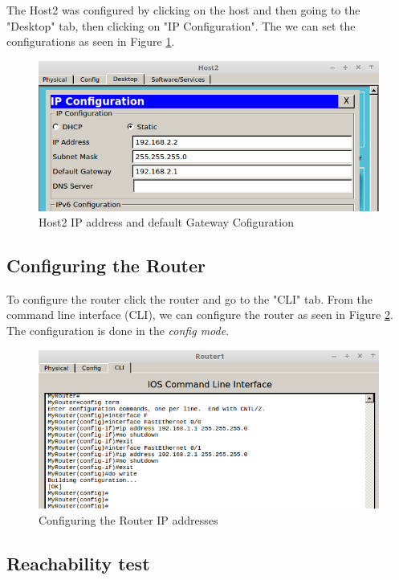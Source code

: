 \documentclass{article}
\begin{document}
The Host2 was configured by clicking on the host and then going to the "Desktop" tab, then clicking on "IP Configuration". The we can set the configurations as seen in Figure \ref{fig:host2config}.
\begin{figure}[!h]
    \centering
    \includegraphics[width=\textwidth]{host2config}
    \caption{Host2 IP address and default Gateway Cofiguration}
    \label{fig:host2config}
\end{figure}
\newpage
\subsection{Configuring the Router}

To configure the router click the router and go to the "CLI" tab. From the command line interface (CLI), we can configure the router as seen in Figure \ref{fig:2routerconfig}. The configuration is done in the \textit{config mode}. 

\begin{figure}[h]
    \includegraphics[width=\textwidth]{2routerconf}
    \caption{Configuring the Router IP addresses}
    \label{fig:2routerconfig}
\end{figure}

\newpage
\subsection{Reachability test}
\end{document}
